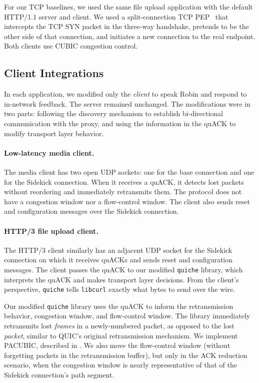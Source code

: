 For our TCP baselines, we used the same file upload application with the
default HTTP/1.1 server and client. We used a split-connection
TCP PEP~\cite{caini2006pepsal} that intercepts the TCP
SYN packet in the three-way handshake, pretends to be the other side of that
connection, and initiates a new connection to the real endpoint.
Both clients use CUBIC congestion control.

\subsection{Client Integrations}
\label{sec:sidekick:implementation:client-integrations}

In each application, we modified only the \emph{client} to speak Robin
and respond to in-network feedback. The server remained unchanged.
The modifications were in two parts: following the discovery mechanism to
establish bi-directional communication with the proxy, and using the information
in the quACK to modify transport layer behavior.



\paragraph{Low-latency media client.} The media client has two open UDP sockets:
one for the base connection and one for the Sidekick connection. When it receives a
quACK, it detects lost packets without reordering and immediately retransmits
them. The protocol does not have a congestion window nor a flow-control window.
The client also sends reset and configuration messages over the Sidekick connection.

\paragraph{HTTP/3 file upload client.}
The HTTP/3 client similarly has an adjacent UDP socket for the Sidekick connection on
which it receives quACKs and sends reset and configuration messages. The client
passes the quACK to our modified \texttt{quiche} library, which interprets the
quACK and makes transport layer decisions. From the client's perspective,
\texttt{quiche} tells \texttt{libcurl} exactly what bytes to send over the wire.

Our modified \texttt{quiche} library uses the quACK to inform the
retransmission behavior, congestion window, and flow-control window. The library
immediately retransmits lost \emph{frames} in a newly-numbered
packet, as opposed to the lost \emph{packet}, similar to QUIC's original
retransmission mechanism. We implement PACUBIC,
described in .
We also move the flow-control window (without forgetting packets in the
retransmission buffer), but only in the ACK reduction scenario, when the
congestion window is nearly representative of that of the Sidekick connection's
path segment.

